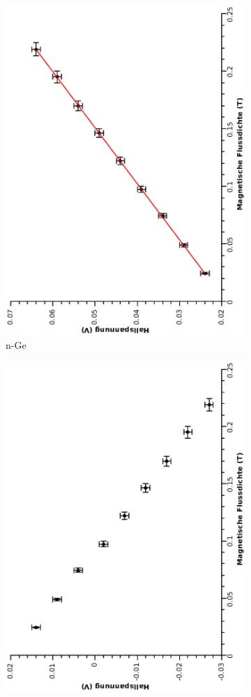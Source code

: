 \documentclass[12pt,a4paper,twopage]{article}
\begin{document}
\begin{figure}[H]
\begin{subfigure}{0.4\textwidth}
\includegraphics[width=0.9\linewidth, angle=-90]{npe.eps}
\caption{n-Ge}
\end{subfigure}
\begin{subfigure}{0.4\textwidth}
\includegraphics[width=0.9\linewidth, angle=-90]{npeumpol.eps}

\end{subfigure}
\end{figure}
\end{document}
